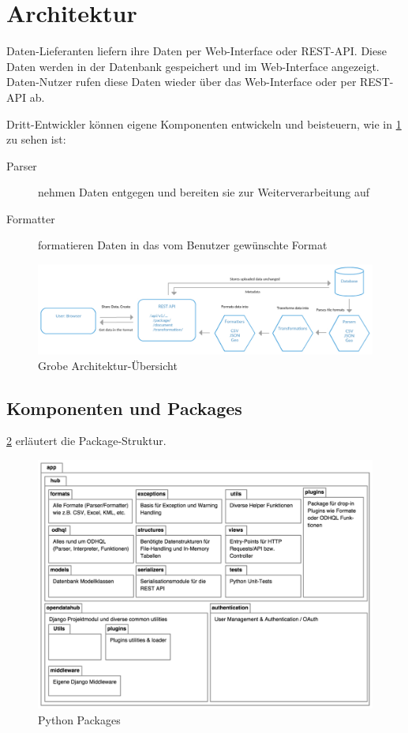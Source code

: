 \section{Architektur}
Daten-Lieferanten liefern ihre Daten per Web-Interface oder REST-API. Diese Daten werden in der Datenbank gespeichert und im Web-Interface angezeigt. Daten-Nutzer rufen diese Daten wieder über das Web-Interface oder per REST-API ab. 

Dritt-Entwickler können eigene Komponenten entwickeln und beisteuern, wie in \cref{fig:pd:arch-overview} zu sehen ist:
\begin{description}
\item[Parser] nehmen Daten entgegen und bereiten sie zur Weiterverarbeitung auf
\item[Formatter] formatieren Daten in das vom Benutzer gewünschte Format
\end{description}

\begin{figure}[H]
    \centering
    \includegraphics[width=\linewidth]{fig/ODH-Architecture-Overview}
    \caption{Grobe Architektur-Übersicht}
    \label{fig:pd:arch-overview}
\end{figure}

\subsection{Komponenten und Packages}

\cref{fig:pd:pypackages} erläutert die Package-Struktur.

\begin{figure}[H]
    \centering
    \includegraphics[width=\linewidth]{fig/packages}
    \caption{Python Packages}
    \label{fig:pd:pypackages}
\end{figure}

